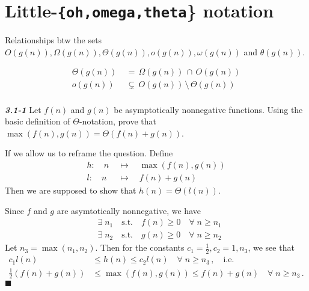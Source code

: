 \documentclass{article}
\begin{document}
\section{Little-\texttt{\{oh,omega,theta}\} notation}
Relationships btw the sets $O(g(n)), \Omega(g(n)), \Theta(g(n)), o(g(n)), \omega(g(n))$ and $\theta(g(n)).$

  \begin{align*}
    \Theta(g(n))\; &=\, \Omega(g(n)) \,\cap\, O(g(n)) \\
    o(g(n)) &\subsetneq\, O(g(n)) \,\setminus\, \Theta\left(g(n)\right) \\
  \end{align*}


\noindent
\textbf{\textsl{3.1-1}}
Let $f(n)$ and $g(n)$ be asymptotically nonnegative functions. Using the basic definition of $\Theta$-notation,
prove that $\max\left(f(n), g(n)\right) = \Theta(f(n) + g(n))$.
\newline
\newline

If we allow us to reframe the question. Define
\begin{align*}
	h \!:\quad n \;&\mapsto\quad \max(f(n), g(n)) \\
	l \!:\quad n \;&\mapsto\quad f(n) + g(n)
\end{align*}
Then we are supposed to show that $h(n) = \Theta(l(n))$.

\noindent
Since $f$ and $g$ are asymtotically nonnegative, we have
\begin{align*}
	& \exists\; n_1 \quad\textrm{s.t.}\quad f(n) \ge 0 \quad\forall\; n \ge n_1 \\
	& \exists\; n_2 \quad\textrm{s.t.}\quad g(n) \ge 0 \quad\forall\; n \ge n_2
\end{align*}
Let $n_3 = \max(n_1, n_2)$. Then for the constants $c_1=\frac{1}{2}, c_2=1, n_3$, we see that
\begin{align*}
	c_1 l(n) &\le h(n) \le c_2 l(n) \quad\forall\; n \ge n_3\,, \quad \textrm{i.e.}\\
	\frac{1}{2}(f(n) + g(n)) &\le \max\left(f(n), g(n)\right) \le f(n) + g(n) \quad\forall\; n \ge n_3\,.
\end{align*}
\hfill$\blacksquare$
\end{document}
